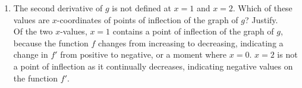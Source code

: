 \documentclass[10pt, letterpaper]{report}
\begin{document}
\begin{enumerate}
\begin{enumerate}
    \item{The second derivative of $g$ is not defined at $x=1$ and $x=2$. Which of these values are $x$-coordinates of points of inflection of the graph of $g$? Justify.} \\

      Of the two $x$-values, $x=1$ contains a point of inflection of the graph of $g$, because the function $f$ changes from increasing to decreasing, indicating a change in $f'$ from positive to negative, or a moment where $x=0$. $x=2$ is not a point of inflection as it continually decreases, indicating negative values on the function $f'$. \\
  \end{enumerate}
\end{enumerate}
\end{document}
